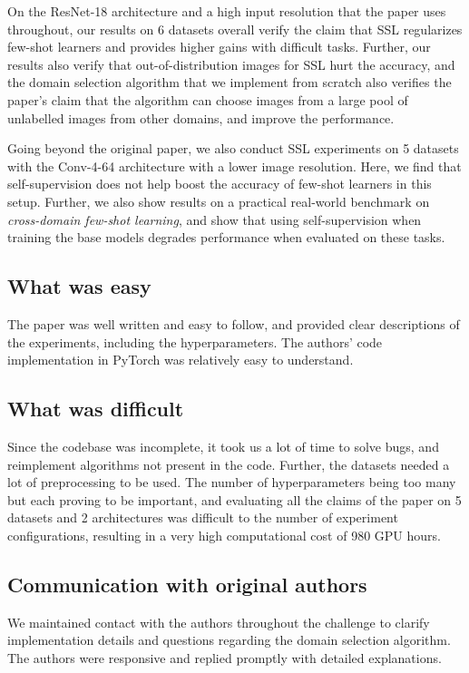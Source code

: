On the ResNet-18 architecture and a high input resolution that the paper uses throughout, our results on 6 datasets overall verify the claim that SSL regularizes few-shot learners and provides higher gains with difficult tasks. Further, our results also verify that out-of-distribution images for SSL hurt the accuracy, and the domain selection algorithm that we implement from scratch also verifies the paper's claim that the algorithm can choose images from a large pool of unlabelled images from other domains, and improve the performance.

Going beyond the original paper, we also conduct SSL experiments on 5 datasets with the Conv-4-64 architecture with a lower image resolution. Here, we find that self-supervision {does not} help boost the accuracy of few-shot learners in this setup. Further, we also show results on a practical real-world benchmark on \textit{cross-domain few-shot learning}, and show that using self-supervision when training the base models degrades performance when evaluated on these tasks.

\subsection*{What was easy}

The paper was well written and easy to follow, and provided clear descriptions of the experiments, including the hyperparameters. The authors' code implementation in PyTorch was relatively easy to understand.

\subsection*{What was difficult}

Since the codebase was incomplete, it took us a lot of time to solve bugs, and reimplement algorithms not present in the code. Further, the datasets needed a lot of preprocessing to be used. The number of hyperparameters being too many but each proving to be important, and evaluating all the claims of the paper on 5 datasets and 2 architectures was difficult to the number of experiment configurations, resulting in a very high computational cost of 980 GPU hours.

\subsection*{Communication with original authors}

We maintained contact with the authors throughout the challenge to clarify implementation details and questions regarding the domain selection algorithm. The authors were responsive and replied promptly with detailed explanations.

